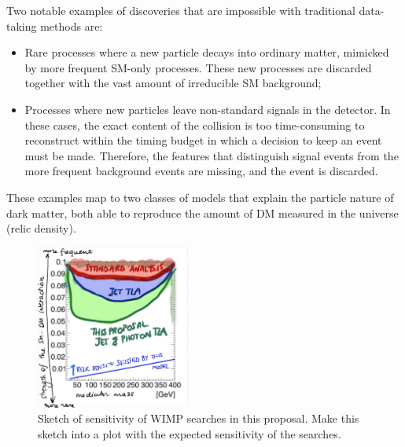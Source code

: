 \documentclass[11pt,a4paper]{article}
\begin{document}
Two notable examples of discoveries that are impossible with traditional data-taking methods are:
\begin{itemize} 
\item Rare processes where a new particle decays into ordinary matter, mimicked by more frequent SM-only processes.
These new processes are discarded together with the vast amount of irreducible SM background;
\item Processes where new particles leave non-standard signals in the detector. 
In these cases, the exact content of the collision is too time-consuming to reconstruct within the timing budget in which a decision to keep an event must be made. Therefore, the features that distinguish signal events from the more frequent background events are missing, and the event is discarded.
\end{itemize}

These examples map to two classes of models that explain the particle nature of dark matter, both able to reproduce the amount of DM measured in the universe (relic density). 

\begin{figure} 
\begin{center}
\includegraphics[width=0.45\textwidth]{figs/SensitivityWIMP.png}
\caption{Sketch of sensitivity of WIMP searches in this proposal. \scriptsize \color{red} Make this sketch into a plot with the expected sensitivity of the searches. \color{black}\label{fig:pastFutureConstraints} }
\end{center}
\end{figure}
\end{document}
